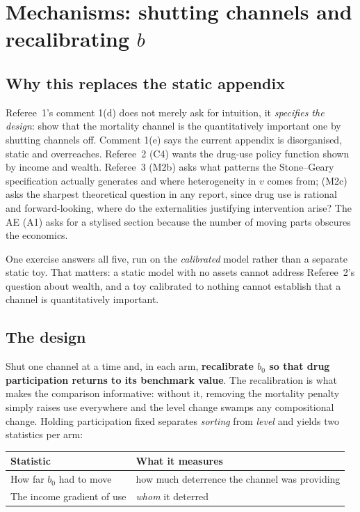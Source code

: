 \documentclass[11pt]{article}
\begin{document}
\section{Mechanisms: shutting channels and recalibrating $b$}
\label{sec:mech}

\subsection{Why this replaces the static appendix}

Referee~1's comment 1(d) does not merely ask for intuition, it \emph{specifies
the design}: show that the mortality channel is the quantitatively important one
by shutting channels off. Comment 1(e) says the current appendix is disorganised,
static and overreaches. Referee~2 (C4) wants the drug-use policy function shown
by income and wealth. Referee~3 (M2b) asks what patterns the Stone--Geary
specification actually generates and where heterogeneity in $v$ comes from;
(M2c) asks the sharpest theoretical question in any report, since drug use is
rational and forward-looking, where do the externalities justifying intervention
arise? The AE (A1) asks for a stylised section because the number of moving parts
obscures the economics.

One exercise answers all five, run on the \emph{calibrated} model rather than a
separate static toy. That matters: a static model with no assets cannot address
Referee~2's question about wealth, and a toy calibrated to nothing cannot
establish that a channel is quantitatively important.

\subsection{The design}

Shut one channel at a time and, in each arm, \textbf{recalibrate $b_0$ so that
drug participation returns to its benchmark value}. The recalibration is what
makes the comparison informative: without it, removing the mortality penalty
simply raises use everywhere and the level change swamps any compositional
change. Holding participation fixed separates \emph{sorting} from \emph{level}
and yields two statistics per arm:

\begin{center}
\begin{tabular}{ll}
\toprule
Statistic & What it measures\\
\midrule
How far $b_0$ had to move & how much deterrence the channel was providing\\
The income gradient of use & \emph{whom} it deterred\\
\bottomrule
\end{tabular}
\end{center}
\end{document}
